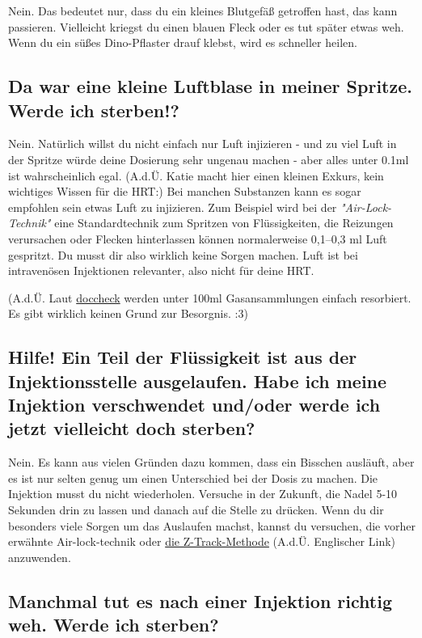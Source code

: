 \documentclass{article}
\begin{document}
Nein. Das bedeutet nur, dass du ein kleines Blutgefäß getroffen hast, das kann passieren. Vielleicht kriegst du einen blauen Fleck oder es tut später etwas weh. Wenn du ein süßes Dino-Pflaster drauf klebst, wird es schneller heilen.

\subsection{Da war eine kleine Luftblase in meiner Spritze. Werde ich sterben!?}\label{7-7}

Nein. Natürlich willst du nicht einfach nur Luft injizieren - und zu viel Luft in der Spritze würde deine Dosierung sehr ungenau machen - aber alles unter 0.1ml ist wahrscheinlich egal. (A.d.Ü. Katie macht hier einen kleinen Exkurs, kein wichtiges Wissen für die HRT:) Bei manchen Substanzen kann es sogar empfohlen sein etwas Luft zu injizieren. Zum Beispiel wird bei der \textit{"Air-Lock-Technik"} eine Standardtechnik zum Spritzen von Flüssigkeiten, die Reizungen verursachen oder Flecken hinterlassen können normalerweise 0,1–0,3 ml Luft gespritzt. Du musst dir also wirklich keine Sorgen machen. Luft ist bei intravenösen Injektionen relevanter, also nicht für deine HRT.

(A.d.Ü. Laut \href{https://flexikon.doccheck.com/de/Gasembolie#PathogeneseURL}{doccheck} werden unter 100ml Gasansammlungen einfach resorbiert. Es gibt wirklich keinen Grund zur Besorgnis. :3)

\subsection{Hilfe! Ein Teil der Flüssigkeit ist aus der Injektionsstelle ausgelaufen. Habe ich meine Injektion verschwendet und/oder werde ich jetzt vielleicht doch sterben?}

Nein. Es kann aus vielen Gründen dazu kommen, dass ein Bisschen ausläuft, aber es ist nur selten genug um einen Unterschied bei der Dosis zu machen. Die Injektion musst du nicht wiederholen. Versuche in der Zukunft, die Nadel 5-10 Sekunden drin zu lassen und danach auf die Stelle zu drücken. Wenn du dir besonders viele Sorgen um das Auslaufen machst, kannst du versuchen, die vorher erwähnte Air-lock-technik oder \href{https://www.nurse.com/nursing-resources/definitions/what-is-z-track-method/}{die Z-Track-Methode} (A.d.Ü. Englischer Link) anzuwenden.

\subsection{Manchmal tut es nach einer Injektion richtig weh. Werde ich sterben?}
\end{document}
